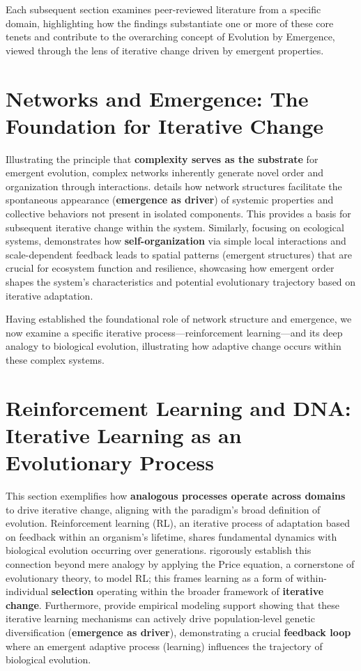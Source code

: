 \documentclass[12pt,openany]{book}
\begin{document}
Each subsequent section examines peer-reviewed literature from a specific domain, highlighting how the findings substantiate one or more of these core tenets and contribute to the overarching concept of Evolution by Emergence, viewed through the lens of iterative change driven by emergent properties.

\section{Networks and Emergence: The Foundation for Iterative Change} \label{sec:networks}
Illustrating the principle that \textbf{complexity serves as the substrate} for emergent evolution, complex networks inherently generate novel order and organization through interactions. \citet{green2023emergence} details how network structures facilitate the spontaneous appearance (\textbf{emergence as driver}) of systemic properties and collective behaviors not present in isolated components. This provides a basis for subsequent iterative change within the system. Similarly, focusing on ecological systems, \citet{levin2005self} demonstrates how \textbf{self-organization} via simple local interactions and scale-dependent feedback leads to spatial patterns (emergent structures) that are crucial for ecosystem function and resilience, showcasing how emergent order shapes the system's characteristics and potential evolutionary trajectory based on iterative adaptation.

Having established the foundational role of network structure and emergence, we now examine a specific iterative process—reinforcement learning—and its deep analogy to biological evolution, illustrating how adaptive change occurs within these complex systems.

\section{Reinforcement Learning and DNA: Iterative Learning as an Evolutionary Process} \label{sec:rl_dna}
This section exemplifies how \textbf{analogous processes operate across domains} to drive iterative change, aligning with the paradigm's broad definition of evolution. Reinforcement learning (RL), an iterative process of adaptation based on feedback within an organism's lifetime, shares fundamental dynamics with biological evolution occurring over generations. \citet{borgstede2021reinforcement} rigorously establish this connection beyond mere analogy by applying the Price equation, a cornerstone of evolutionary theory, to model RL; this frames learning as a form of within-individual \textbf{selection} operating within the broader framework of \textbf{iterative change}. Furthermore, \citet{mcnamara2024reinforcement} provide empirical modeling support showing that these iterative learning mechanisms can actively drive population-level genetic diversification (\textbf{emergence as driver}), demonstrating a crucial \textbf{feedback loop} where an emergent adaptive process (learning) influences the trajectory of biological evolution.
\end{document}
